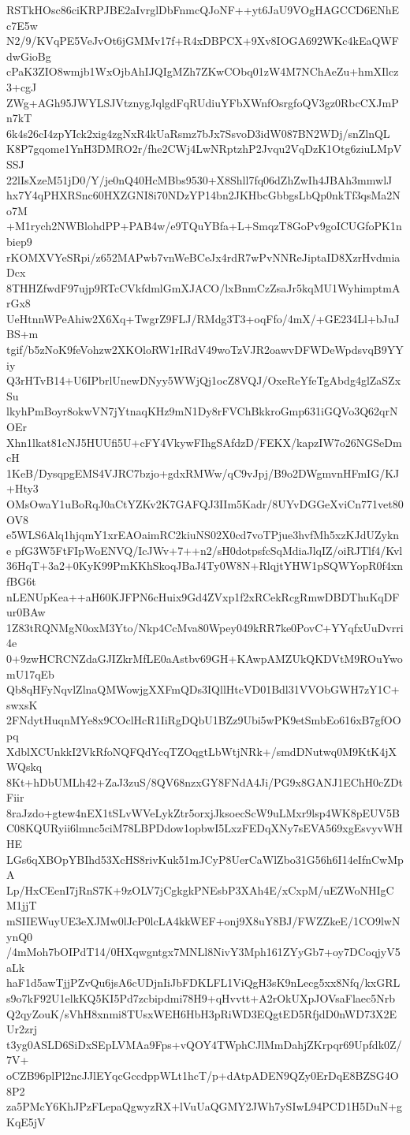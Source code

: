 RSTkHOsc86ciKRPJBE2aIvrglDbFnmcQJoNF++yt6JaU9VOgHAGCCD6ENhEc7E5w
N2/9/KVqPE5VeJvOt6jGMMv17f+R4xDBPCX+9Xv8IOGA692WKc4kEaQWFdwGioBg
cPaK3ZIO8wmjb1WxOjbAhIJQIgMZh7ZKwCObq01zW4M7NChAeZu+hmXIlcz3+cgJ
ZWg+AGh95JWYLSJVtznygJqlgdFqRUdiuYFbXWnfOsrgfoQV3gz0RbcCXJmPn7kT
6k4s26cI4zpYIck2xig4zgNxR4kUaRsmz7bJx7SsvoD3idW087BN2WDj/snZlnQL
K8P7gqome1YnH3DMRO2r/fhe2CWj4LwNRptzhP2Jvqu2VqDzK1Otg6ziuLMpVSSJ
22lIsXzeM51jD0/Y/je0nQ40HcMBbs9530+X8Shll7fq06dZhZwIh4JBAh3mmwlJ
hx7Y4qPHXRSnc60HXZGNI8i70NDzYP14bn2JKHbcGbbgsLbQp0nkTf3qsMa2No7M
+M1rych2NWBlohdPP+PAB4w/e9TQuYBfa+L+SmqzT8GoPv9goICUGfoPK1nbiep9
rKOMXVYeSRpi/z652MAPwb7vnWeBCeJx4rdR7wPvNNReJiptaID8XzrHvdmiaDcx
8THHZfwdF97ujp9RTcCVkfdmlGmXJACO/lxBnmCzZsaJr5kqMU1WyhimptmArGx8
UeHtnnWPeAhiw2X6Xq+TwgrZ9FLJ/RMdg3T3+oqFfo/4mX/+GE234Ll+bJuJBS+m
tgif/b5zNoK9feVohzw2XKOloRW1rIRdV49woTzVJR2oawvDFWDeWpdsvqB9YYiy
Q3rHTvB14+U6IPbrlUnewDNyy5WWjQj1ocZ8VQJ/OxeReYfeTgAbdg4glZaSZxSu
lkyhPmBoyr8okwVN7jYtnaqKHz9mN1Dy8rFVChBkkroGmp631iGQVo3Q62qrNOEr
Xhn1lkat81cNJ5HUUfi5U+cFY4VkywFIhgSAfdzD/FEKX/kapzIW7o26NGSeDmcH
1KeB/DysqpgEMS4VJRC7bzjo+gdxRMWw/qC9vJpj/B9o2DWgmvnHFmIG/KJ+Hty3
OMsOwaY1uBoRqJ0aCtYZKv2K7GAFQJ3IIm5Kadr/8UYvDGGeXviCn771vet80OV8
e5WLS6Alq1hjqmY1xrEAOaimRC2kiuNS02X0cd7voTPjue3hvfMh5xzKJdUZykne
pfG3W5FtFIpWoENVQ/IcJWv+7++n2/sH0dotpsfcSqMdiaJlqIZ/oiRJTlf4/Kvl
36HqT+3a2+0KyK99PmKKhSkoqJBaJ4Ty0W8N+RlqjtYHW1pSQWYopR0f4xnfBG6t
nLENUpKea++aH60KJFPN6cHuix9Gd4ZVxp1f2xRCekRcgRmwDBDThuKqDFur0BAw
1Z83tRQNMgN0oxM3Yto/Nkp4CcMva80Wpey049kRR7ke0PovC+YYqfxUuDvrri4e
0+9zwHCRCNZdaGJIZkrMfLE0aAstbv69GH+KAwpAMZUkQKDVtM9ROuYwomU17qEb
Qb8qHFyNqvlZlnaQMWowjgXXFmQDs3IQllHtcVD01Bdl31VVObGWH7zY1C+swxsK
2FNdytHuqnMYe8x9COclHcR1IiRgDQbU1BZz9Ubi5wPK9etSmbEo616xB7gfOOpq
XdblXCUnkkI2VkRfoNQFQdYcqTZOqgtLbWtjNRk+/smdDNutwq0M9KtK4jXWQskq
8Kt+hDbUMLh42+ZaJ3zuS/8QV68nzxGY8FNdA4Ji/PG9x8GANJ1EChH0cZDtFiir
8raJzdo+gtew4nEX1tSLvWVeLykZtr5orxjJksoecScW9uLMxr9lsp4WK8pEUV5B
C08KQURyii6lmnc5ciM78LBPDdow1opbwI5LxzFEDqXNy7sEVA569xgEsvyvWHHE
LGs6qXBOpYBIhd53XcHS8rivKuk51mJCyP8UerCaWlZbo31G56h6I14eIfnCwMpA
Lp/HxCEenI7jRnS7K+9zOLV7jCgkgkPNEsbP3XAh4E/xCxpM/uEZWoNHIgCM1jjT
mSIIEWuyUE3eXJMw0lJcP0lcLA4kkWEF+onj9X8uY8BJ/FWZZkeE/1CO9lwNynQ0
/4mMoh7bOIPdT14/0HXqwgntgx7MNLl8NivY3Mph161ZYyGb7+oy7DCoqjyV5aLk
haF1d5awTjjPZvQu6jsA6cUDjnIiJbFDKLFL1ViQgH3sK9nLecg5xx8Nfq/kxGRL
s9o7kF92U1elkKQ5KI5Pd7zcbipdmi78H9+qHvvtt+A2rOkUXpJOVsaFlaec5Nrb
Q2qyZouK/sVhH8xnmi8TUsxWEH6HbH3pRiWD3EQgtED5RfjdD0nWD73X2EUr2zrj
t3yg0ASLD6SiDxSEpLVMAa9Fps+vQOY4TWphCJlMmDahjZKrpqr69Upfdk0Z/7V+
oCZB96plPl2ncJJlEYqcGccdppWLt1hcT/p+dAtpADEN9QZy0ErDqE8BZSG4O8P2
za5PMcY6KhJPzFLepaQgwyzRX+lVuUaQGMY2JWh7ySIwL94PCD1H5DuN+gKqE5jV
